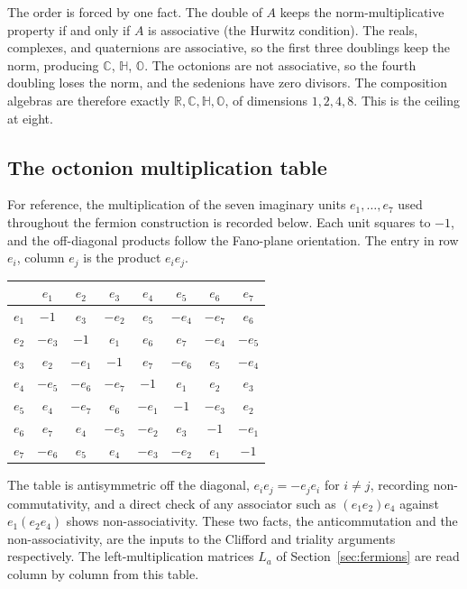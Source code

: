 The order is forced by one fact. The double of $A$ keeps the norm-multiplicative property if and only if $A$ is
associative (the Hurwitz condition). The reals, complexes, and quaternions are associative, so the first three
doublings keep the norm, producing $\mathbb{C}$, $\mathbb{H}$, $\mathbb{O}$. The octonions are not associative, so the
fourth doubling loses the norm, and the sedenions have zero divisors. The composition algebras are therefore exactly
$\mathbb{R}, \mathbb{C}, \mathbb{H}, \mathbb{O}$, of dimensions $1, 2, 4, 8$. This is the ceiling at eight.

\subsection*{The octonion multiplication table}

For reference, the multiplication of the seven imaginary units $e_1, \dots, e_7$ used throughout the fermion
construction is recorded below. Each unit squares to $-1$, and the off-diagonal products follow the Fano-plane
orientation. The entry in row $e_i$, column $e_j$ is the product $e_i e_j$.

\begin{center}
\renewcommand{\arraystretch}{1.2}
\begin{tabular}{c|ccccccc}
        & $e_1$  & $e_2$  & $e_3$  & $e_4$  & $e_5$  & $e_6$  & $e_7$  \\
  \hline
  $e_1$ & $-1$   & $e_3$  & $-e_2$ & $e_5$  & $-e_4$ & $-e_7$ & $e_6$  \\
  $e_2$ & $-e_3$ & $-1$   & $e_1$  & $e_6$  & $e_7$  & $-e_4$ & $-e_5$ \\
  $e_3$ & $e_2$  & $-e_1$ & $-1$   & $e_7$  & $-e_6$ & $e_5$  & $-e_4$ \\
  $e_4$ & $-e_5$ & $-e_6$ & $-e_7$ & $-1$   & $e_1$  & $e_2$  & $e_3$  \\
  $e_5$ & $e_4$  & $-e_7$ & $e_6$  & $-e_1$ & $-1$   & $-e_3$ & $e_2$  \\
  $e_6$ & $e_7$  & $e_4$  & $-e_5$ & $-e_2$ & $e_3$  & $-1$   & $-e_1$ \\
  $e_7$ & $-e_6$ & $e_5$  & $e_4$  & $-e_3$ & $-e_2$ & $e_1$  & $-1$   \\
\end{tabular}
\end{center}

The table is antisymmetric off the diagonal, $e_i e_j = - e_j e_i$ for $i \neq j$, recording non-commutativity, and a
direct check of any associator such as $(e_1 e_2) e_4$ against $e_1 (e_2 e_4)$ shows non-associativity. These two
facts, the anticommutation and the non-associativity, are the inputs to the Clifford and triality arguments
respectively. The left-multiplication matrices $L_a$ of Section~\ref{sec:fermions} are read column by column from this
table.
